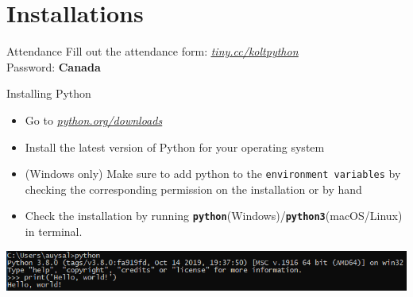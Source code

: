 	\section{Installations}

	\begin{frame}{Attendance}
        \pause
        \Huge
        Fill out the attendance form: \href{https://tiny.cc/koltpython}{\underline{\textit{tiny.cc/koltpython}}}\\
        \pause
        Password: \textbf{Canada}
    \end{frame}

	\begin{frame}{Installing Python}
        \LARGE
        \begin{itemize}
            \item Go to \href{https://www.python.org/downloads/}{\underline{\textit{python.org/downloads}}}
            \pause
            \item Install the latest version of Python for your operating system
            \pause
            \item (Windows only) Make sure to add python to the \texttt{environment variables} by checking the corresponding permission on the installation or by hand
            \pause
            \item Check the installation by running \textbf{\texttt{python}}(Windows)/\textbf{\texttt{python3}}(macOS/Linux) in terminal.
        \end{itemize}
        \includegraphics[width=\textwidth]{images/cmd_helloworld.PNG}
    \end{frame}
     
